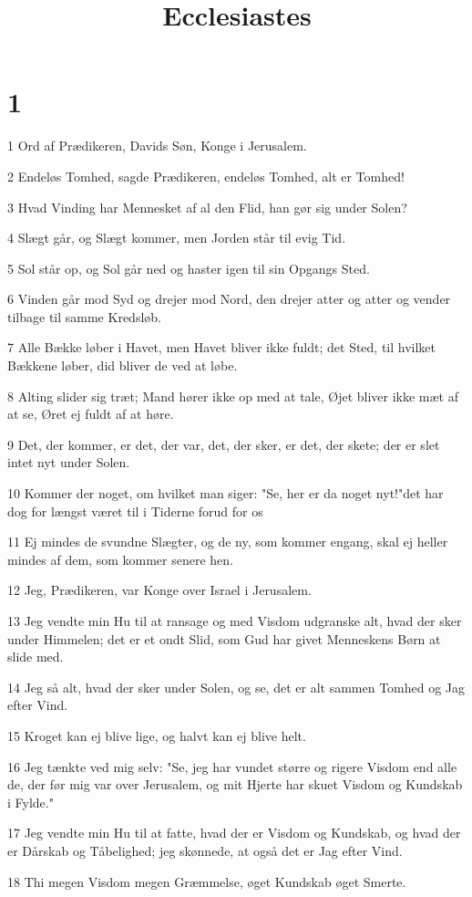 

\title{Ecclesiastes}


\chapter{1}

\par 1 Ord af Prædikeren, Davids Søn, Konge i Jerusalem.
\par 2 Endeløs Tomhed, sagde Prædikeren, endeløs Tomhed, alt er Tomhed!
\par 3 Hvad Vinding har Mennesket af al den Flid, han gør sig under Solen?
\par 4 Slægt går, og Slægt kommer, men Jorden står til evig Tid.
\par 5 Sol står op, og Sol går ned og haster igen til sin Opgangs Sted.
\par 6 Vinden går mod Syd og drejer mod Nord, den drejer atter og atter og vender tilbage til samme Kredsløb.
\par 7 Alle Bække løber i Havet, men Havet bliver ikke fuldt; det Sted, til hvilket Bækkene løber, did bliver de ved at løbe.
\par 8 Alting slider sig træt; Mand hører ikke op med at tale, Øjet bliver ikke mæt af at se, Øret ej fuldt af at høre.
\par 9 Det, der kommer, er det, der var, det, der sker, er det, der skete; der er slet intet nyt under Solen.
\par 10 Kommer der noget, om hvilket man siger: "Se, her er da noget nyt!"det har dog for længst været til i Tiderne forud for os
\par 11 Ej mindes de svundne Slægter, og de ny, som kommer engang, skal ej heller mindes af dem, som kommer senere hen.
\par 12 Jeg, Prædikeren, var Konge over Israel i Jerusalem.
\par 13 Jeg vendte min Hu til at ransage og med Visdom udgranske alt, hvad der sker under Himmelen; det er et ondt Slid, som Gud har givet Menneskens Børn at slide med.
\par 14 Jeg så alt, hvad der sker under Solen, og se, det er alt sammen Tomhed og Jag efter Vind.
\par 15 Kroget kan ej blive lige, og halvt kan ej blive helt.
\par 16 Jeg tænkte ved mig selv: "Se, jeg har vundet større og rigere Visdom end alle de, der før mig var over Jerusalem, og mit Hjerte har skuet Visdom og Kundskab i Fylde."
\par 17 Jeg vendte min Hu til at fatte, hvad der er Visdom og Kundskab, og hvad der er Dårskab og Tåbelighed; jeg skønnede, at også det er Jag efter Vind.
\par 18 Thi megen Visdom megen Græmmelse, øget Kundskab øget Smerte.

